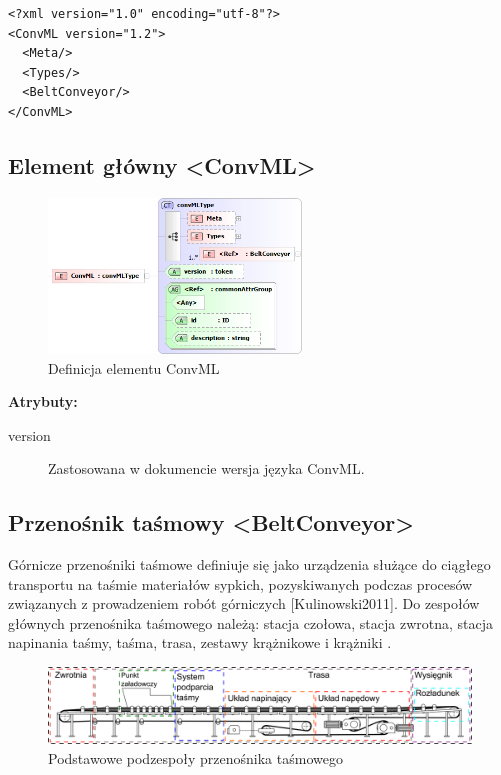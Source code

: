 \documentclass[12pt,a4paper]{article}
\begin{document}
\begin{verbatim}
<?xml version="1.0" encoding="utf-8"?>
<ConvML version="1.2">
  <Meta/>
  <Types/>
  <BeltConveyor/>
</ConvML>
\end{verbatim}  


\subsection{Element główny <ConvML>}

\begin{figure}[H]
  \centering
  \includegraphics[width=0.6\textwidth]{png/liquid/ConvML}
  \caption{Definicja elementu ConvML}
  \label{fig:convml-xsd}
\end{figure}

\noindent\textbf{Atrybuty:}
\begin{description}
\item[version] Zastosowana w dokumencie wersja języka ConvML.
\end{description}


\subsection{Przenośnik taśmowy <BeltConveyor>}\label{sec:BeltConveyor}
Górnicze przenośniki taśmowe definiuje się jako urządzenia służące do ciągłego
transportu na taśmie materiałów sypkich, pozyskiwanych podczas procesów
związanych z prowadzeniem robót górniczych [Kulinowski2011].  Do zespołów
głównych przenośnika taśmowego należą: stacja czołowa, stacja zwrotna, stacja
napinania taśmy, taśma, trasa, zestawy krążnikowe i krążniki
\cite{Antoniak2005}.

\begin{figure}
  \centering
  \includegraphics[width=\textwidth]{png/belt_conveyor_drw}
  \caption{Podstawowe podzespoły przenośnika taśmowego}
  \label{fig:beltConveyor-drw}
\end{figure}
\end{document}
